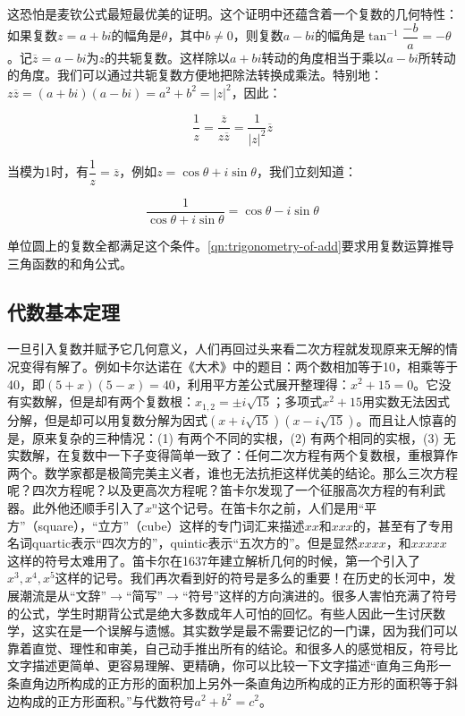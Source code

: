 \documentclass[b5paper]{ctexart}
\begin{document}
这恐怕是麦钦公式最短最优美的证明。这个证明中还蕴含着一个复数的几何特性：如果复数$z = a + bi$的幅角是$\theta$，其中$b \ne 0$，则复数$a - bi$的幅角是$\tan^{-1}\dfrac{-b}{a} = -\theta$。记$\overline{z} = a - bi$为$z$的共轭复数。这样除以$a + bi$转动的角度相当于乘以$a - bi$所转动的角度。我们可以通过共轭复数方便地把除法转换成乘法。特别地：$z\overline{z} = (a + bi)(a - bi) = a^2 + b^2 = |z|^2$，因此：

\[
\frac{1}{z} = \frac{\overline{z}}{z\overline{z}} = \frac{1}{|z|^2}\overline{z}
\]

当模为1时，有$\dfrac{1}{z} = \overline{z}$，例如$z = \cos\theta + i\sin\theta$，我们立刻知道：

\[
\frac{1}{\cos\theta + i\sin\theta} = \cos\theta - i\sin\theta
\]

单位圆上的复数全都满足这个条件。\ref{qn:trigonometry-of-add}要求用复数运算推导三角函数的和角公式。

\subsection{代数基本定理}

一旦引入复数并赋予它几何意义，人们再回过头来看二次方程就发现原来无解的情况变得有解了。例如卡尔达诺在《大术》中的题目：两个数相加等于10，相乘等于40，即$(5 + x)(5 - x) = 40$，利用平方差公式展开整理得：$x^2 + 15 = 0$。它没有实数解，但是却有两个复数根：$x_{1,2} = \pm i\sqrt{15}$；多项式$x^2 + 15$用实数无法因式分解，但是却可以用复数分解为因式$(x + i\sqrt{15})(x - i\sqrt{15})$。而且让人惊喜的是，原来复杂的三种情况：(1) 有两个不同的实根，(2) 有两个相同的实根，(3) 无实数解，在复数中一下子变得简单一致了：任何二次方程有两个复数根，重根算作两个。数学家都是极简完美主义者，谁也无法抗拒这样优美的结论。那么三次方程呢？四次方程呢？以及更高次方程呢？笛卡尔发现了一个征服高次方程的有利武器。此外他还顺手引入了$x^n$这个记号。在笛卡尔之前，人们是用“平方”（square），“立方”（cube）这样的专门词汇来描述$xx$和$xxx$的，甚至有了专用名词quartic表示“四次方的”，quintic表示“五次方的”。但是显然$xxxx$，和$xxxxx$这样的符号太难用了。笛卡尔在1637年建立解析几何的时候，第一个引入了$x^3, x^4, x^5$这样的记号。我们再次看到好的符号是多么的重要！在历史的长河中，发展潮流是从“文辞”$\to$“简写”$\to$“符号”这样的方向演进的。很多人害怕充满了符号的公式，学生时期背公式是绝大多数成年人可怕的回忆。有些人因此一生讨厌数学，这实在是一个误解与遗憾。其实数学是最不需要记忆的一门课，因为我们可以靠着直觉、理性和审美，自己动手推出所有的结论。和很多人的感觉相反，符号比文字描述更简单、更容易理解、更精确，你可以比较一下文字描述“直角三角形一条直角边所构成的正方形的面积加上另外一条直角边所构成的正方形的面积等于斜边构成的正方形面积。”与代数符号$a^2 + b^2 = c^2$。
\end{document}
